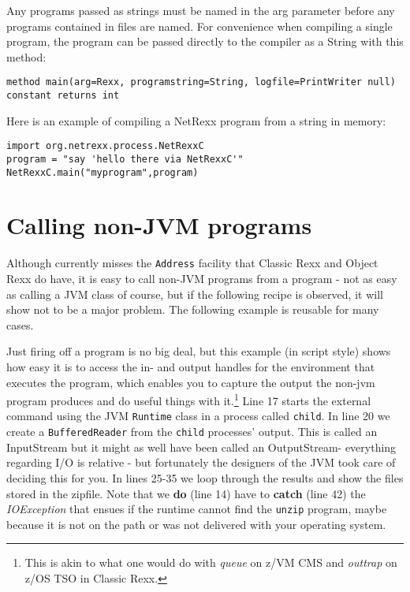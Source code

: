 {Any programs passed as strings must be named in the arg parameter before any programs contained in files are named.
For convenience when compiling a single program, the program can be
passed directly to the compiler as a String with this method:

\begin{lstlisting}[label=string,caption=With String argument]
method main(arg=Rexx, programstring=String, logfile=PrintWriter null) constant returns int
\end{lstlisting}

Here is an example of compiling a NetRexx program from a string in
memory:

\begin{lstlisting}[label=memexample,caption=Example of compiling from String]
import org.netrexx.process.NetRexxC
program = "say 'hello there via NetRexxC'"
NetRexxC.main("myprogram",program)
\end{lstlisting}

\chapter{Calling non-JVM programs}
Although \nr{} currently misses the \texttt{Address} facility that
Classic Rexx and Object Rexx do have, it is easy to call non-JVM programs
from a \nr{} program - not as easy as calling a JVM class of course, but if
the following recipe is observed, it will show not to be a major
problem. The following example is reusable for many cases.
 
Just firing off a program is no big deal, but this example (in script
style) shows how easy it is to access the in- and output handles for
the environment that executes the program, which enables you to
capture the output the non-jvm program produces and do useful things
with it.\footnote{This is akin to what one would do with \emph{queue}
  on z/VM CMS and \emph{outtrap} on z/OS TSO in Classic Rexx.}
Line 17 starts the external command using the JVM \texttt{Runtime}
class in a process called \texttt{child}. In line 20 we create a
\texttt{BufferedReader} from the \texttt{child} processes'
output. This is called an InputStream but it might as well have been
called an OutputStream- everything regarding I/O is relative - but
fortunately the designers of the JVM took care of deciding this for you.
In lines 25-35 we loop through the results and show the files stored
in the zipfile. Note that we \textbf{do} (line 14) have to \textbf{catch} (line
42) the \emph{IOException} that ensues if the runtime cannot find the
\texttt{unzip} program, maybe because it is not on the path or was not
delivered with your operating system. 



}
